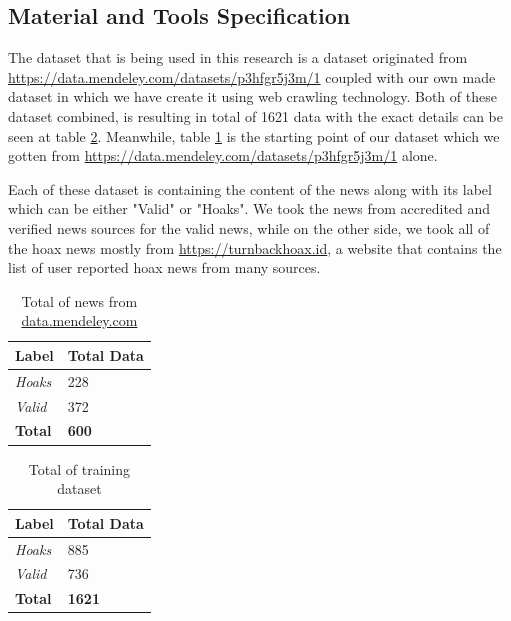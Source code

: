 \subsection{Material and Tools Specification}

The dataset that is being used in this research is a dataset originated from \url{https://data.mendeley.com/datasets/p3hfgr5j3m/1} coupled with our own made dataset in which we have create it using web crawling technology. Both of these dataset combined, is resulting in total of 1621 data with the exact details can be seen at table \ref{tab:dataset}. Meanwhile, table \ref{tab:dataset_mendeley} is the starting point of our dataset which we gotten from \url{https://data.mendeley.com/datasets/p3hfgr5j3m/1} alone.

Each of these dataset is containing the content of the news along with its label which can be either "Valid" or "Hoaks". We took the news from accredited and verified news sources for the valid news, while on the other side, we took all of the hoax news mostly from \url{https://turnbackhoax.id}, a website that contains the list of user reported hoax news from many sources.

\begin{table}[h]
    \caption{Total of news from \url{data.mendeley.com}}
    \label{tab:dataset_mendeley}
    \centering
    \begin{tabular}{ | l | l | }
        \hline
        \textbf{Label} & \textbf{Total Data} \\ \hline
        \textit{Hoaks} & 228                 \\ \hline
        \textit{Valid} & 372                 \\ \hline
        \textbf{Total} & \textbf{600}        \\ \hline
    \end{tabular}
\end{table}

\begin{table}[h]
    \caption{Total of training dataset}
    \label{tab:dataset}
    \centering
    \begin{tabular}{ | l | l | }
        \hline
        \textbf{Label} & \textbf{Total Data} \\ \hline
        \textit{Hoaks} & 885                 \\ \hline
        \textit{Valid} & 736                 \\ \hline
        \textbf{Total} & \textbf{1621}       \\ \hline
    \end{tabular}
\end{table}


